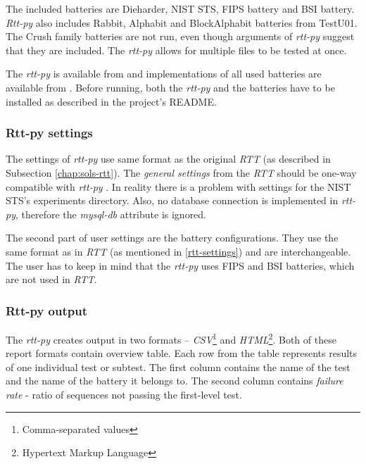 \documentclass[
  digital,     %
  oneside,     %
  nosansbold,  %
  nocolorbold, %
  nolof,         %
  nolot,         %
]{fithesis4}
\begin{document}
The included batteries are Dieharder, NIST STS, FIPS battery and BSI battery. \emph{Rtt-py} also includes Rabbit, Alphabit and BlockAlphabit batteries from TestU01. The Crush family batteries are not run, even though arguments of \emph{rtt-py} suggest that they are included. The \emph{rtt-py} allows for multiple files to be tested at once.


The \emph{rtt-py} is available from \cite{rtt-py-site} and implementations of all used batteries are available from \cite{rtt-py-batteries}. Before running, both the \emph{rtt-py} and the batteries have to be installed as described in the project's README.



\subsubsection{Rtt-py settings}
The settings of \emph{rtt-py} use same format as the original \emph{RTT} (as described in Subsection \ref{chap:sols-rtt}). The \emph{general settings} from the \emph{RTT} should be one-way compatible with \emph{rtt-py} \cite[p. 25]{vavercak}. In reality there is a problem with settings for the NIST STS's experiments directory. Also, no database connection is implemented in \emph{rtt-py}, therefore the \emph{mysql-db} attribute is ignored. \cite{rtt-py-site}

The second part of user settings are the battery configurations. They use the same format as in \emph{RTT} (as mentioned in \ref{rtt-settings}) and are interchangeable.~\cite[p.~25]{vavercak} The user has to keep in mind that the \emph{rtt-py} uses FIPS and BSI batteries, which are not used in \emph{RTT}. 

\subsubsection{Rtt-py output}
The \emph{rtt-py} creates output in two formats -- \emph{CSV}\footnote{Comma-separated values} and \emph{HTML}\footnote{Hypertext Markup Language}. \cite[p. 36]{vavercak} Both of these report formats contain overview table. Each row from the table represents results of one individual test or subtest. The first column contains the name of the test and the name of the battery it belongs to. The second column contains \emph{failure rate} - ratio of sequences not passing the first-level test.
\end{document}
